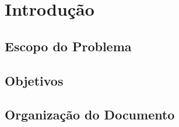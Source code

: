 

\chapter{Introdução} 
\label{chap:Introducao}

\section{Escopo do Problema} 
\label{sec:Escopo-do-Problema}

\lipsum[7-8]


\section{Objetivos}
\label{sec:Objetivos}

\lipsum[10-12]


\section{Organização do Documento}
\label{sec:Organização-do-Documento}

\lipsum[13-15]

